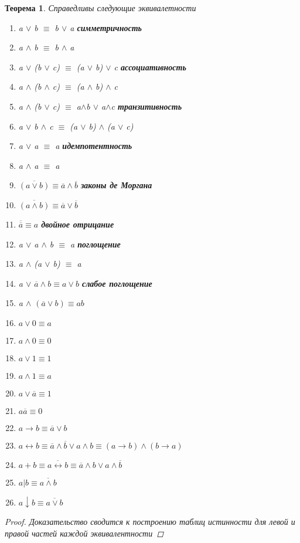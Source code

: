 \documentclass[a4paper]{article}
\newtheorem{theorem}{Теорема}[section]
\theoremstyle{definition}
\theoremstyle{remark}
\begin{document}
	\begin{theorem}
		Справедливы следующие эквивалетности
		\begin{enumerate}
			\item a $\vee$ b $\equiv$ b $\vee$ a  \textbf{симметричность}
			\item a $\wedge$ b $\equiv$ b $\wedge$ a
			\item a $\vee$ (b $\vee$ c) $\equiv$ (a $\vee$ b) $\vee$ c \textbf{ассоциативность}
			\item a $\wedge$ (b $\wedge$ c) $\equiv$ (a $\wedge$ b) $\wedge$ c
			\item a $\wedge$ (b $\vee$ c) $\equiv$ a$\wedge$b $\vee$ a$\wedge$c \textbf{транзитивность}
			\item a $\vee$  b $\wedge$ c $\equiv$ (a $\vee$ b) $\wedge$ (a $\vee$ c)
			\item a $\vee$ a $\equiv$ a \textbf{идемпотентность}
			\item a $\wedge$ a $\equiv$ a
			\item $\overline{(a \vee b)} \equiv \overline{a} \wedge \overline{b}$ \textbf{законы де Моргана}
			\item $\overline{(a \wedge b)} \equiv \overline{a} \vee \overline{b}$
			\item $\overline{\overline{a}} \equiv a$ \textbf{двойное отрицание}
			\item a $\vee$ a $\wedge$ b $\equiv$ a \textbf{поглощение}
			\item a $\wedge$ (a $\vee$ b) $\equiv$ a
			\item a $\vee$ $\overline{a} \wedge b \equiv a \vee b$ \textbf{слабое поглощение}
			\item a $\wedge$ $(\overline{a} \vee b) \equiv ab$
			\item $a \vee 0 \equiv a$
			\item $a \wedge 0 \equiv 0$
			\item $a \vee 1 \equiv 1$
			\item $a \wedge 1 \equiv a$
			\item $a \vee \overline{a} \equiv 1$
			\item $a\overline{a} \equiv 0$
			\item $a \rightarrow b \equiv \overline{a} \vee b$
			\item $a \leftrightarrow b \equiv \overline{a} \wedge \overline{b} \vee a \wedge b \equiv (a \rightarrow b) \wedge (b \rightarrow a)$
			\item $a + b \equiv \overline{a \leftrightarrow b} \equiv \overline{a} \wedge b \vee a \wedge \overline{b}$
			\item $a | b \equiv \overline{a \wedge b}$
			\item $a \downarrow b \equiv \overline{a \vee b}$
		\end{enumerate}
		\begin{proof}
			Доказательство сводится к построению таблиц истинности для левой и правой частей каждой эквивалентности
		\end{proof}
	\end{theorem}
\end{document}
